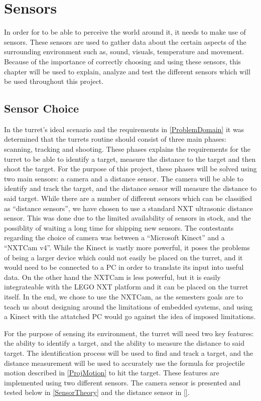 \chapter{Sensors} \label{sensors}
In order for \name to be able to perceive the world around it, it needs to make
use of sensors. These sensors are used to gather data about the certain aspects
of the surrounding environment such as, sound, visuals, temperature and
movement. Because of the importance of correctly choosing and using these
sensors, this chapter will be used to explain, analyze and test the different
sensors which will be used throughout this project.

\section{Sensor Choice}
In the turret's ideal scenario and the requirements in
\autoref{ProblemDomain} it was determined that the turrets routine should
consist of three main phases: scanning, tracking and shooting. These phases explains the
requirements for the turret to be able to identify a target, measure the
distance to the target and then shoot the target. For the purpose of this
project, these phases will be solved using two main sensors: a camera and a
distance sensor. The camera will be able to identify and track the target, and
the distance sensor will measure the distance to said target. While there are a
number of different sensors which can be classified as ``distance sensors'', we
have chosen to use a standard NXT ultrasonic distance sensor. This was done due
to the limited availability of sensors in stock, and the possiblity of waiting a
long time for shipping new sensors. The contestants regarding the choice of
camera was between a ``Microsoft Kinect'' and a ``NXTCam v4''. While the Kinect
is vastly more powerful, it poses the problems of being a larger device which
could not easily be placed on the turret, and it would need to be connected to a
PC in order to translate its input into useful data. On the other hand the
NXTCam is less powerful, but it is easily integrateable with the LEGO NXT
platform and it can be placed on the turret itself. In the end, we chose to use
the NXTCam, as the semesters goals are to teach us about designing around the
limitations of embedded systems, and using a Kinect with the attatched PC would
go against the idea of imposed limitations.\nl

For the purpose of sensing its environment, the turret will need two key
features: the ability to identify a target, and the ability to measure the
distance to said target. The identification process will be used to find and
track a target, and the distance measurement will be used to accurately use the
formula for projectile motion described in \autoref{ProjMotion} to hit the
target. These features are implemented using two different sensors. The camera
sensor is presented and tested below in \autoref{SensorTheory} and the distance
sensor in \autoref{}.




% 
% 
% 
% 
